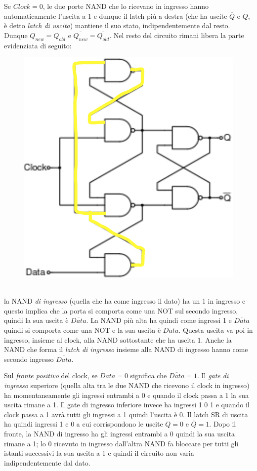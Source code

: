 \documentclass[12pt, a4paper]{report}
\begin{document}
Se $Clock = 0$, le due porte NAND che lo ricevano in ingresso hanno automaticamente l'uscita a 1 e dunque il latch più a destra (che ha uscite $\overline{Q}$ e $Q$, è detto \textit{latch di uscita}) mantiene il suo stato, indipendentemente dal resto. Dunque $Q_{new} = Q_{old}$ e $\overline{Q_{new}} = \overline{Q_{old}}$. Nel resto del circuito rimani libera la parte evidenziata di seguito:
\begin{figure}[h]
    \centering
    \includegraphics[scale=0.35,angle=0]{dff1.png}
    \label{dff1}
\end{figure}
\\la NAND \textit{di ingresso} (quella che ha come ingresso il dato) ha un 1 in ingresso e questo implica che la porta si comporta come una NOT sul secondo ingresso, quindi la sua uscita è $\overline{Data}$. La NAND più alta ha quindi come ingressi 1 e $\overline{Data}$ quindi si comporta come una NOT e la sua uscita è $Data$. Questa uscita va poi in ingresso, insieme al clock, alla NAND sottostante che ha uscita 1. Anche la NAND che forma il \textit{latch di ingresso} insieme alla NAND di ingresso hanno come secondo ingresso $\overline{Data}$.

Sul \textit{fronte positivo} del clock, se $Data = 0$ significa che $\overline{Data} = 1$. Il \textit{gate di ingresso} superiore (quella alta tra le due NAND che ricevono il clock in ingresso) ha momentaneamente gli ingressi entrambi a 0 e quando il clock passa a 1 la sua uscita rimane a 1. Il gate di ingresso inferiore invece ha ingressi 1 0 1 e quando il clock passa a 1 avrà tutti gli ingressi a 1 quindi l'uscita è 0. Il latch SR di uscita ha quindi ingressi 1 e 0 a cui corrispondono le uscite $Q = 0$ e $\overline{Q} = 1$. Dopo il fronte, la NAND di ingresso ha gli ingressi entrambi a 0 quindi la sua uscita rimane a 1; lo 0 ricevuto in ingresso dall'altra NAND fa bloccare per tutti gli istanti successivi la sua uscita a 1 e quindi il circuito non varia indipendentemente dal dato.
\end{document}
